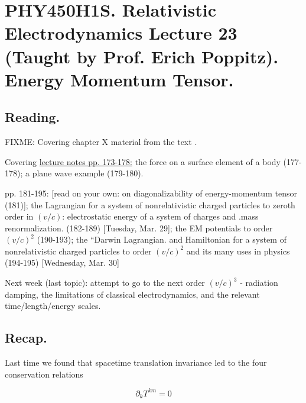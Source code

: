 
%

\chapter{PHY450H1S.  Relativistic Electrodynamics Lecture 23 (Taught by Prof. Erich Poppitz).  Energy Momentum Tensor.}
\label{chap:relativisticElectrodynamicsL23}
{}
\date{Mar 29, 2011}

\beginArtNoToc

\section{Reading.}

FIXME:
Covering chapter X material from the text \cite{landau1980classical}.

Covering \href{http://www.physics.utoronto.ca/~poppitz/epoppitz/PHY450_files/RelEMpp166-180.pdf}{lecture notes pp. 173-178:} the force on a surface element of a body (177-178); a plane wave example (179-180).

pp. 181-195: [read on your own: on diagonalizability of energy-momentum tensor (181)]; the Lagrangian for a system of nonrelativistic charged particles to zeroth order in $(v/c)$: electrostatic energy of a system of charges and .mass renormalization. (182-189) [Tuesday, Mar. 29]; the EM potentials to order $(v/c)^2$ (190-193); the ``Darwin Lagrangian.  and Hamiltonian for a system of nonrelativistic charged particles to order $(v/c)^2$ and its many uses in physics (194-195) [Wednesday, Mar. 30]

Next week (last topic): attempt to go to the next order $(v/c)^3$ - radiation damping, the limitations of classical electrodynamics, and the relevant time/length/energy scales.

\section{Recap.}

Last time we found that spacetime translation invariance led to the four conservation relations

\begin{equation}\label{eqn:relativisticElectrodynamicsL23:10}
\partial_k T^{k m} = 0
\end{equation}

